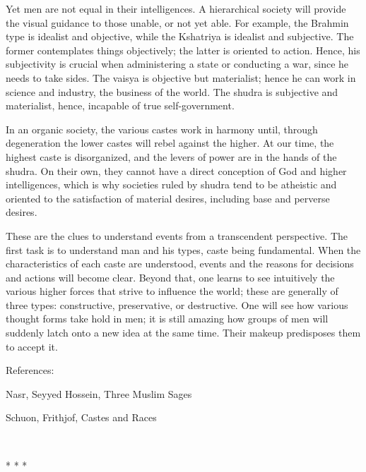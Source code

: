 Yet men are not equal in their intelligences. A hierarchical society will provide the visual guidance to those unable, or not yet able. For example, the Brahmin type is idealist and objective, while the Kshatriya is idealist and subjective. The former contemplates things objectively; the latter is oriented to action. Hence, his subjectivity is crucial when administering a state or conducting a war, since he needs to take sides. The vaisya is objective but materialist; hence he can work in science and industry, the business of the world. The shudra is subjective and materialist, hence, incapable of true self-government.

In an organic society, the various castes work in harmony until, through degeneration the lower castes will rebel against the higher. At our time, the highest caste is disorganized, and the levers of power are in the hands of the shudra. On their own, they cannot have a direct conception of God and higher intelligences, which is why societies ruled by shudra tend to be atheistic and oriented to the satisfaction of material desires, including base and perverse desires.

These are the clues to understand events from a transcendent perspective. The first task is to understand man and his types, caste being fundamental. When the characteristics of each caste are understood, events and the reasons for decisions and actions will become clear. Beyond that, one learns to see intuitively the various higher forces that strive to influence the world; these are generally of three types: constructive, preservative, or destructive. One will see how various thought forms take hold in men; it is still amazing how groups of men will suddenly latch onto a new idea at the same time. Their makeup predisposes them to accept it.


\hfill

References:

Nasr, Seyyed Hossein, Three Muslim Sages

Schuon, Frithjof, Castes and Races




\ \begin{center}* * *\end{center}

